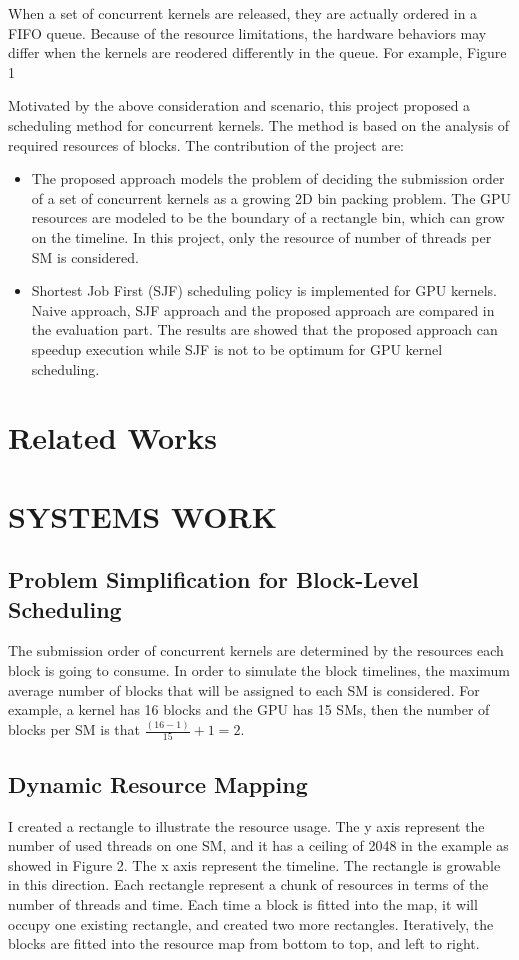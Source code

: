 \documentclass[12pt,journal,compsoc]{IEEEtran}
\begin{document}
When a set of concurrent kernels are released, they are actually ordered in a FIFO queue. Because of the resource limitations, the hardware behaviors may differ when the kernels are reodered differently in the queue. For example, Figure 1 

Motivated by the above consideration and scenario, this project proposed a scheduling method for concurrent kernels. The method is based on the analysis of required resources of blocks. 
The contribution of the project are:
\begin{itemize}
   \item The proposed approach models the problem of deciding the submission order of a set of concurrent kernels as a growing 2D bin packing problem. The GPU resources are modeled to be the boundary of a rectangle bin, which can grow on the timeline. In this project, only the resource of number of threads per SM is considered.
   \item Shortest Job First (SJF) scheduling policy is implemented for GPU kernels. Naive approach, SJF approach and the proposed approach are compared in the evaluation part. The results are showed that the proposed approach can speedup execution while SJF is not to be optimum for GPU kernel scheduling.
\end{itemize}


\section{Related Works}


\section{SYSTEMS WORK}

\subsection{Problem Simplification for Block-Level Scheduling}
The submission order of concurrent kernels are determined by the resources each block is going to consume. In order to simulate the block timelines, the maximum average number of blocks that will be assigned to each SM is considered. For example, a kernel has 16 blocks and the GPU has 15 SMs, then the number of blocks per SM is that $\frac{(16-1)}{15} + 1 = 2$.
\subsection{Dynamic Resource Mapping}
I created a rectangle to illustrate the resource usage. The y axis represent the number of used threads on one SM, and it has a ceiling of 2048 in the example as showed in Figure 2. The x axis represent the timeline. The rectangle is growable in this direction.  Each rectangle represent a chunk of resources in terms of the number of threads and time. Each time a block is fitted into the map, it will occupy one existing rectangle, and created two more rectangles. Iteratively, the blocks are fitted into the resource map from bottom to top, and left to right.
\end{document}
